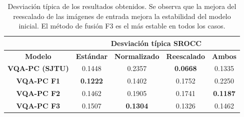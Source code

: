 \begin{table}[htp]
  \scriptsize
  \centering
\begin{tabular}{|c|cccc|}
\hline
\rowcolor[HTML]{FFC702}
                       & \multicolumn{4}{c|}{\textbf{Desviación típica SROCC}}                                                                                                \\ \hline
\rowcolor[HTML]{FFC702}
\textbf{Modelo}        & \multicolumn{1}{c|}{\textbf{Estándar}} & \multicolumn{1}{c|}{\textbf{Normalizado}} & \multicolumn{1}{c|}{\textbf{Reescalado}} & \textbf{Ambos}  \\ \hline
\textbf{VQA-PC (SJTU)} & \multicolumn{1}{c|}{0.1448}            & \multicolumn{1}{c|}{0.2357}               & \multicolumn{1}{c|}{\textbf{0.0668}}    & 0.1335          \\ \hline
\textbf{VQA-PC F1}     & \multicolumn{1}{c|}{\textbf{0.1222}}   & \multicolumn{1}{c|}{0.1402}               & \multicolumn{1}{c|}{0.1752}             & 0.2250          \\ \hline
\textbf{VQA-PC F2}     & \multicolumn{1}{c|}{0.1462}            & \multicolumn{1}{c|}{0.1905}               & \multicolumn{1}{c|}{0.1741}             & \textbf{0.1187} \\ \hline
\textbf{VQA-PC F3}     & \multicolumn{1}{c|}{0.1507}            & \multicolumn{1}{c|}{\textbf{0.1304}}      & \multicolumn{1}{c|}{0.1326}             & 0.1462          \\ \hline
\end{tabular}
\caption[Desviación típica de los resultados médicos]{Desviación típica de los 
resultados obtenidos. Se observa que la mejora del reescalado de las imágenes 
de entrada mejora la estabilidad del modelo inicial. El método de fusión F3 
es el más estable en todos los casos. }
\label{tab:STDevMed}
\end{table}

